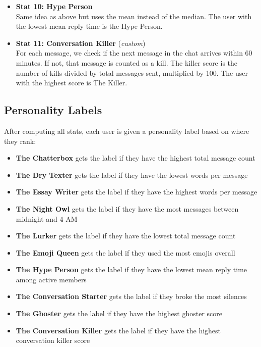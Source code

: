 \documentclass{article}
\begin{document}
\begin{itemize}
\item \textbf{Stat 10: Hype Person} \\
Same idea as above but uses the mean instead of the median. The user with the lowest mean reply time is the Hype Person.

\item \textbf{Stat 11: Conversation Killer} (\textit{custom}) \\
For each message, we check if the next message in the chat arrives within 60 minutes. If not, that message is counted as a kill. The killer score is the number of kills divided by total messages sent, multiplied by 100. The user with the highest score is The Killer.


\end{itemize}

\subsection*{Personality Labels}

After computing all stats, each user is given a personality label based on where they rank:

\begin{itemize}
    \item \textbf{The Chatterbox} gets the label if they have the highest total message count
    \item \textbf{The Dry Texter} gets the label if they have the lowest words per message
    \item \textbf{The Essay Writer} gets the label if they have the highest words per message
    \item \textbf{The Night Owl} gets the label if they have the most messages between midnight and 4 AM
    \item \textbf{The Lurker} gets the label if they have the lowest total message count
    \item \textbf{The Emoji Queen} gets the label if they used the most emojis overall
    \item \textbf{The Hype Person} gets the label if they have the lowest mean reply time among active members
    \item \textbf{The Conversation Starter} gets the label if they broke the most silences
    \item \textbf{The Ghoster} gets the label if they have the highest ghoster score
    \item \textbf{The Conversation Killer} gets the label if they have the highest conversation killer score

\end{itemize}
\end{document}
